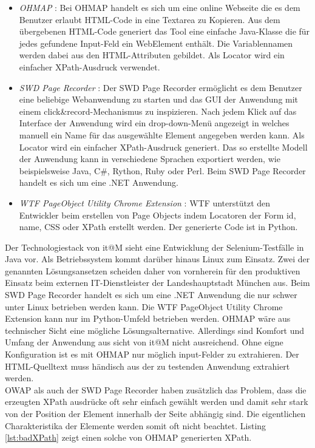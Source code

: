 \begin{itemize}
\item \textit{OHMAP} \cite{virtuetech_gmbh_ohmap_2015}: Bei OHMAP handelt es sich um eine online Webseite die es dem Benutzer erlaubt HTML-Code in eine Textarea zu Kopieren. Aus dem übergebenen HTML-Code generiert das Tool eine einfache Java-Klasse die für jedes gefundene Input-Feld ein WebElement enthält. Die Variablennamen werden dabei aus den HTML-Attributen gebildet. Als Locator wird ein einfacher XPath-Ausdruck verwendet.
	
\item \textit{SWD Page Recorder} \cite{dmytro_zharii_dzharii/swd-recorder_2015}: Der SWD Page Recorder ermöglicht es dem Benutzer eine beliebige Webanwendung zu starten und das GUI der Anwendung mit einem click\&record-Mechanismus zu inspizieren.
Nach jedem Klick auf das Interface der Anwendung wird ein drop-down-Menü angezeigt in welches manuell ein Name für das ausgewählte Element angegeben werden kann. Als Locator wird ein einfacher XPath-Ausdruck generiert.
Das so erstellte Modell der Anwendung kann in verschiedene Sprachen exportiert werden, wie beispielsweise Java, C\#, Rython, Ruby oder Perl. Beim SWD Page Recorder handelt es sich um eine .NET Anwendung.

\item\textit{ WTF PageObject Utility Chrome Extension} \cite{daniel_wiredrive/wtframework_2015}: WTF unterstützt den Entwickler beim erstellen von Page Objects indem Locatoren der Form id, name, CSS oder XPath erstellt werden. Der generierte Code ist in Python.
	
\end{itemize}

Der Technologiestack von it@M sieht eine Entwicklung der Selenium-Testfälle in Java vor. Als Betriebssystem kommt darüber hinaus Linux zum Einsatz.
Zwei der genannten Lösungsansetzen scheiden daher von vornherein für den produktiven Einsatz beim externen IT-Dienstleister der Landeshauptstadt München aus. Beim SWD Page Recorder handelt es sich um eine .NET Anwendung die nur schwer unter Linux betrieben werden kann. Die WTF PageObject Utility Chrome Extension kann nur im Python-Umfeld betrieben werden. OHMAP wäre aus technischer Sicht eine mögliche Lösungsalternative. Allerdings sind Komfort und Umfang der Anwendung aus sicht von it@M nicht ausreichend. Ohne eigne Konfiguration ist es mit OHMAP nur möglich input-Felder zu extrahieren.
Der HTML-Quelltext muss händisch aus der zu testenden Anwendung extrahiert werden. \\
OWAP als auch der SWD Page Recorder haben zusätzlich das Problem, dass die erzeugten XPath ausdrücke oft sehr einfach gewählt werden und damit sehr stark von der Position der Element innerhalb der Seite abhängig sind. Die eigentlichen Charakteristika der Elemente werden somit oft nicht beachtet. Listing \ref{lst:badXPath}
zeigt einen solche von OHMAP generierten XPath.

